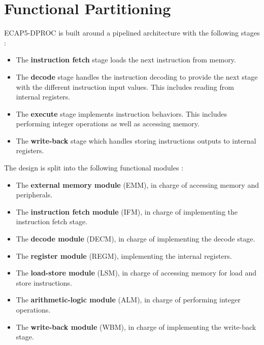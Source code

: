 \section{Functional Partitioning}

\begin{content}
  ECAP5-DPROC is built around a pipelined architecture with the following stages :
  \begin{itemize}
    \vspace{-0.5em}
    \item The \textbf{instruction fetch} stage loads the next instruction from memory.
    \vspace{-0.5em}
    \item The \textbf{decode} stage handles the instruction decoding to provide the next stage with the different instruction input values. This includes reading from internal registers.
    \vspace{-0.5em}
    \item The \textbf{execute} stage implements instruction behaviors. This includes performing integer operations as well as accessing memory.
    \vspace{-0.5em}
    \item The \textbf{write-back} stage which handles storing instructions outputs to internal registers.
  \end{itemize}

  The design is split into the following functional modules :
  \begin{itemize}
    \vspace{-0.5em}
    \item The \textbf{external memory module} (EMM), in charge of accessing memory and peripherals.
    \vspace{-0.5em}
    \item The \textbf{instruction fetch module} (IFM), in charge of implementing the instruction fetch stage.
    \vspace{-0.5em}
    \item The \textbf{decode module} (DECM), in charge of implementing the decode stage.
    \vspace{-0.5em}
    \item The \textbf{register module} (REGM), implementing the internal registers.
    \vspace{-0.5em}
    \item The \textbf{load-store module} (LSM), in charge of accessing memory for load and store instructions.
    \vspace{-0.5em}
    \item The \textbf{arithmetic-logic module} (ALM), in charge of performing integer operations.
    \vspace{-0.5em}
    \item The \textbf{write-back module} (WBM), in charge of implementing the write-back stage.
  \end{itemize}
\end{content}


